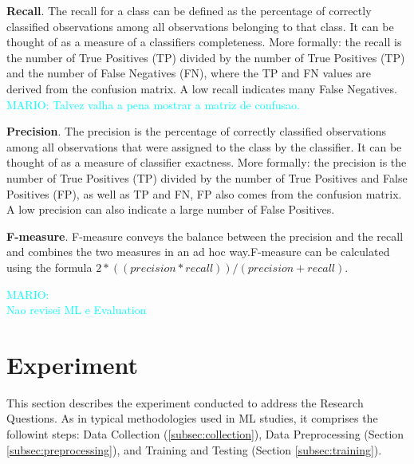 \documentclass[10pt, conference]{IEEEtran}
\newcommand{\mario}[1]{\noindent\textcolor{cyan}{MARIO: {#1}}}
\newcommand{\mario}[1]{}
\begin{document}
\textbf{Recall}. The recall for a class can be defined as the percentage of correctly classified observations among all observations belonging to that class. It can be thought of as a measure of a classifiers completeness. More formally\cite{Facelli2015}: the recall is the number of True Positives (TP) divided by the number of True Positives (TP) and the number of False Negatives (FN), where the TP and FN values are derived from the confusion matrix. A low recall indicates many False Negatives\cite{Zhao2013}. \mario{Talvez valha a pena mostrar a matriz de confusao.}

\textbf{Precision}. The precision is the percentage of correctly classified observations among all observations that were assigned to the class by the classifier. It can be thought of as a measure of classifier exactness. More formally\cite{Facelli2015}: the precision is the number of True Positives (TP) divided by the number of True Positives and False Positives (FP), as well as TP and FN, FP also comes from the confusion matrix. A low precision can also indicate a large number of False Positives\cite{Zhao2013}.

\textbf{F-measure}. F-measure conveys the balance between the precision and the recall and combines the two measures in an ad hoc way\cite{Feldman2007, Zhao2013}.F-measure can be calculated using the formula $2*((precision*recall))/(precision+recall)$. 

\mario{\\Nao revisei ML e Evaluation}

\section{Experiment} \label{sec:experiment}
This section describes the experiment conducted to address the Research Questions. As in typical methodologies used in ML studies, it comprises the followint steps: Data Collection (\ref{subsec:collection}), Data Preprocessing (Section \ref{subsec:preprocessing}), and Training and Testing (Section \ref{subsec:training}).
\end{document}
